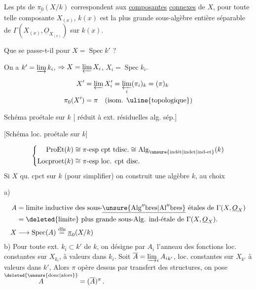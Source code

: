 
 Les pts  de $\underline{\pi_0}(X/k)$ correspondent aux \uline{composantes} \uline{connexes} de $X$, pour toute telle composante $X_{(x)}$, $k(x)$ est la plus grande sous-algèbre entière séparable de $\Gamma(X_{(x)},\underline{O}_{X_{(x)}})$ sur $k(x)$.

Que se passe-t-il pour $X=\operatorname{Spec}k'$ ? 

On a $k'=\varinjlim k_i$, $\Rightarrow X=\varprojlim X_i$, $X_i=\operatorname{Spec} k_i$.

\[
\begin{aligned}
X'&=\varprojlim X'_i=\varprojlim_i(\pi_i)_{k}=(\pi)_k\\
\pi_0(X')&=\pi\quad(\text{isom. \uline{topologique}})
\end{aligned}
\]

Schéma proétale sur $k$ [   réduit à ext. résiduelles  alg. sép.]

\deleted{\S} [Schéma loc. proétale sur $k$]

\[
\left\{\begin{aligned}
\mathrm{ProEt}(k)&\cong\pi\text{-esp cpt tdisc.}\cong\mathrm{Alg}_{\text{\unsure{indét|indet|ind-et}}}(k)\\
\mathrm{Locproet}(k)&\cong\pi\text{-esp loc. cpt disc.}
\end{aligned}\right.
\]
Si $X$ qu. cpct sur $k$ (pour simplifier) on construit une algèbre   $k$, au choix

a)

\[
\begin{aligned}
A&=\text{limite inductive des sous-}\underline{\unsure{\mathrm{Alg}^{\prime\prime}\mathrm{bres}|\mathrm{Al}''\mathrm{bres}}}\ \text{étales de }\Gamma(X,\underline{O}_X)\\
&=\text{\deleted{limite} plus grande sous-Alg. ind-étale de }\Gamma(X,\underline{O}_X).\\
X&\longrightarrow\operatorname{Spec}(A)\overset{\text{dfn}}{=}\underline{\pi}_0(X/k)
\end{aligned}
\]
b) Pour toute ext.   $k_i\subset k'$ de $k$, on désigne par  $A_i$ l'anneau des fonctions loc. constantes sur $X_{k_i}$, à valeurs dans $k_i$. Soit $\overline A=\varinjlim_i {A_i}_{k'}$,    loc. constantes sur $X_{k'}$ à valeurs dans $k'$, Alors  $\pi$ opère dessus par transfert des structures, on pose $\overset{\deleted{\unsure{\text{donc}|\text{alors}}}}{A}=(\overline A)^\pi$.

